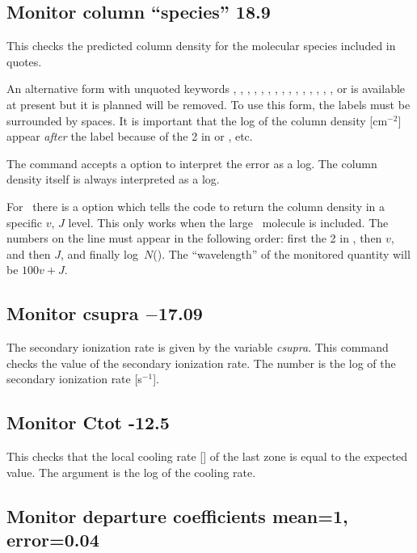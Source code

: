 \subsection{Monitor column ``species'' 18.9}

This checks the predicted column density for the molecular species
included in quotes.

An alternative form with unquoted keywords ,
, , , ,
, , , ,
, , , ,
, , or  is available at
present but it is planned will be removed.  To use this form, the
labels must be surrounded by spaces.  It is important that the log of
the column density [cm$^{-2}$] appear \emph{after} the label because
of the 2 in  or , etc.

The command accepts a  option to interpret
the error as a log.
The column density itself is always interpreted as a log.

For \htwo\ there is a  option which tells the code
to return the column density in a specific $v$, $J$ level.
This only works when the large \htwo\ molecule
is included.
The numbers on the line must appear in the following order:
first the 2 in , then $v$,
and then $J$, and finally log~$N$(\htwo).
The ``wavelength'' of the
monitored quantity will be $100v + J$.

\subsection{Monitor csupra $-$17.09}

The secondary ionization rate is given by the variable \emph{csupra}.
This command checks the value of the secondary ionization rate.
The number is the log of the secondary ionization rate [s$^{-1}$].

\subsection{Monitor Ctot -12.5}

This checks that the local cooling rate [\ergpccmps ]
of the last zone is equal to the expected value.
The argument is the log of the cooling rate.

\subsection{Monitor departure coefficients  mean=1, error=0.04}

